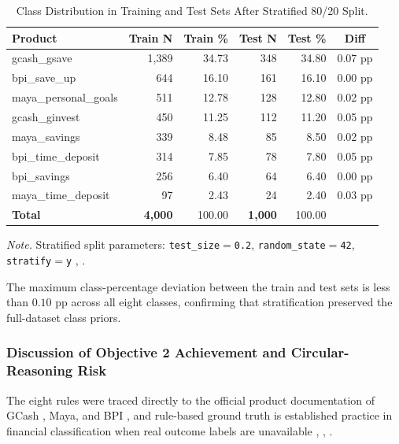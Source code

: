 \documentclass[journal]{./IEEE/IEEEtran}
\begin{document}
\begin{table}[h]
    \centering
    \caption{Class Distribution in Training and Test Sets After Stratified 80/20 Split.}
    \label{tab:split}
    \footnotesize
    \begin{tabular}{|p{2cm}|r|r|r|r|c|}
        \hline
        \textbf{Product} & \textbf{Train N} & \textbf{Train \%} & \textbf{Test N} & \textbf{Test \%} & \textbf{Diff} \\
        \hline
        gcash\_gsave & 1{,}389 & 34.73 & 348 & 34.80 & 0.07 pp \\
        bpi\_save\_up & 644 & 16.10 & 161 & 16.10 & 0.00 pp \\
        maya\_personal\_\newline goals & 511 & 12.78 & 128 & 12.80 & 0.02 pp \\
        gcash\_ginvest & 450 & 11.25 & 112 & 11.20 & 0.05 pp \\
        maya\_savings & 339 & 8.48 & 85 & 8.50 & 0.02 pp \\
        bpi\_time\_deposit & 314 & 7.85 & 78 & 7.80 & 0.05 pp \\
        bpi\_savings & 256 & 6.40 & 64 & 6.40 & 0.00 pp \\
        maya\_time\_deposit & 97 & 2.43 & 24 & 2.40 & 0.03 pp \\
        \hline
        \textbf{Total} & \textbf{4{,}000} & 100.00 & \textbf{1{,}000} & 100.00 & \\
        \hline
    \end{tabular}

    \vspace{0.5em}
    \raggedright\scriptsize \emph{Note.} Stratified split parameters: \texttt{test\_size$=$0.2}, \texttt{random\_state$=$42}, \texttt{stratify$=$y} \cite{ref59}, \cite{ref74}.
\end{table}

The maximum class-percentage deviation between the train and test sets is less than $0.10$ pp across all eight classes, confirming that stratification preserved the full-dataset class priors.

\subsubsection{Discussion of Objective 2 Achievement and Circular-Reasoning Risk}
The eight rules were traced directly to the official product documentation of GCash \cite{ref6}, Maya, and BPI \cite{ref37}, and rule-based ground truth is established practice in financial classification when real outcome labels are unavailable \cite{ref46}, \cite{ref56}, \cite{ref57}.
\end{document}
